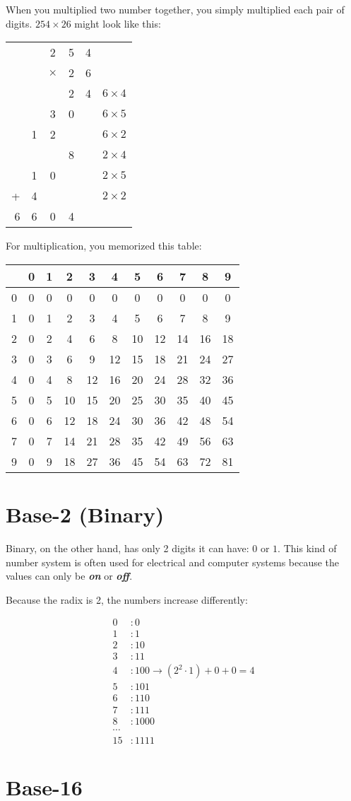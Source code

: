 When you multiplied two number together, you simply multiplied each
pair of digits. $254 \times 26$ might look like this:

\begin{tabular} {r c c c c | c}
 & & 2 & 5 & 4 & \\
 & & $\times$ & 2 & 6 & \\
 \hline
& &  & 2 & 4 & $6 \times 4$\\
& & 3 & 0 & & $6 \times 5$ \\
& 1 & 2 & & & $6 \times 2$ \\
& & & 8 & & $2 \times 4$ \\
& 1 & 0 & & & $2 \times 5$\\
+ & 4 & & & & $2 \times 2$\\
 \hline
 6 & 6 & 0 & 4
 \end{tabular}
 

For multiplication, you memorized this table:

\begin{tabular}{ c || c | c | c | c | c | c| c| c| c| c}
 & 0 & 1 & 2 & 3 & 4 & 5 & 6 & 7 & 8 & 9 \\
 \hline
 0 & 0 & 0 & 0 & 0 & 0 & 0 & 0 & 0 & 0 & 0 \\
 1 & 0 & 1 & 2 & 3 & 4 & 5 & 6 & 7 & 8 & 9 \\
 2 & 0 & 2 & 4 & 6 & 8 & 10 & 12 & 14 & 16 & 18 \\
 3 & 0 & 3 & 6 & 9 & 12 & 15 & 18 & 21 & 24 & 27 \\
 4 & 0 & 4 & 8 & 12 & 16 & 20 & 24 & 28 & 32 & 36 \\
 5 & 0 & 5 & 10 & 15 & 20 & 25 & 30 & 35 & 40 & 45 \\
 6 & 0 & 6 & 12 & 18 & 24 & 30 & 36 & 42 & 48 & 54 \\
 7 & 0 & 7 & 14 & 21 & 28 & 35 & 42 & 49 & 56 & 63 \\
 9 & 0 & 9 & 18 & 27 & 36 & 45 & 54 & 63 & 72 & 81 
 \end{tabular}

\section{Base-2 (Binary)}
Binary, on the other hand, has only 2 digits it can have: $0$ or $1$. 
This kind of number system is often used for electrical and computer systems because the values can only be \textbf{\emph{on}} or \textbf{\emph{off}}.

Because the radix is 2, the numbers increase differently:

\begin{align*}
  0&: 0 \\
  1&: 1 \\
  2&: 10 \\
  3&: 11 \\
  4&: 100 \rightarrow (2^{2}\cdot 1) + 0 + 0 = 4 \\
  5&: 101 \\
  6&: 110 \\
  7&: 111 \\
  8&: 1000 \\
  \cdots& \\
  15&: 1111
\end{align*}

\section{Base-16}